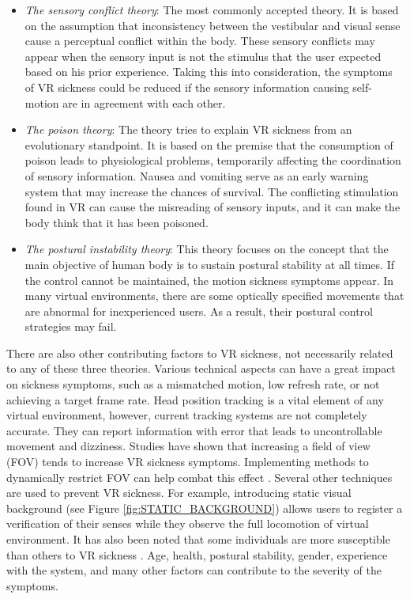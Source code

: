 \begin{itemize}
\item \textit{The sensory conflict theory}: The most commonly accepted theory. It is based on the assumption that inconsistency between the vestibular and visual sense cause a perceptual conflict within the body. These sensory conflicts may appear when the sensory input is not the stimulus that the user expected based on his prior experience. Taking this into consideration, the symptoms of VR sickness could be reduced if the sensory information causing self-motion are in agreement with each other.
\item \textit{The poison theory}: The theory tries to explain VR sickness from an evolutionary standpoint. It is based on the premise that the consumption of poison leads to physiological problems, temporarily affecting the coordination of sensory information. Nausea and vomiting serve as an early warning system that may increase the chances of survival. The conflicting stimulation found in VR can cause the misreading of sensory inputs, and it can make the body think that it has been poisoned.
\item \textit{The postural instability theory}: This theory focuses on the concept that the main objective of human body is to sustain postural stability at all times. If the control cannot be maintained, the motion sickness symptoms appear. In many virtual environments, there are some optically specified movements that are abnormal for inexperienced users. As a result, their postural control strategies may fail.
\end{itemize}

There are also other contributing factors to VR sickness, not necessarily related to any of these three theories. Various technical aspects can have a great impact on sickness symptoms, such as a mismatched motion, low refresh rate, or not achieving a target frame rate. Head position tracking is a vital element of any virtual environment, however, current tracking systems are not completely accurate. They can report information with error that leads to uncontrollable movement and dizziness. Studies have shown that increasing a field of view (FOV) tends to increase VR sickness symptoms. Implementing methods to dynamically restrict FOV can help combat this effect \cite{DYNAMICFOD}. Several other techniques are used to prevent VR sickness. For example, introducing static visual background (see Figure \ref{fig:STATIC_BACKGROUND}) allows users to register a verification of their senses while they observe the full locomotion of virtual environment. It has also been noted that some individuals are more susceptible than others to VR sickness \cite{VRINDIVIDUALS}. Age, health, postural stability, gender, experience with the system, and many other factors can contribute to the severity of the symptoms.

